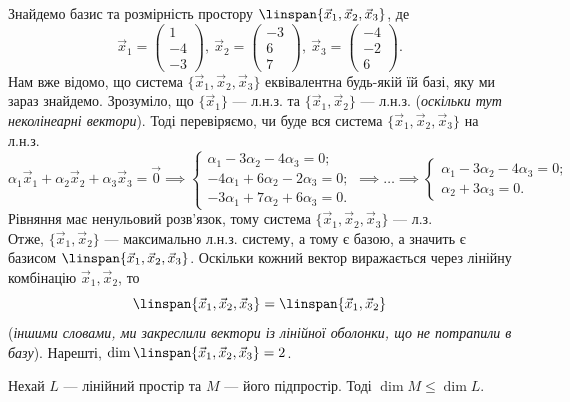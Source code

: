\documentclass{math_library}
\begin{document}
	\begin{example}
	Знайдемо базис та розмірність простору $\linspan \{ \vec{x}_1, \vec{x}_2, \vec{x}_3 \}$, де
	\[
	\vec{x}_1 = \begin{pmatrix}
	1 \\ -4 \\ -3
	\end{pmatrix},\ \vec{x}_2 = \begin{pmatrix}
	-3 \\ 6 \\ 7
	\end{pmatrix},\ \vec{x}_3 = \begin{pmatrix}
	-4 \\ -2 \\ 6
	\end{pmatrix}.
	\]
	Нам вже відомо, що система $\{\vec{x}_1,\vec{x}_2,\vec{x}_3\}$ еквівалентна будь-якій їй базі, яку ми зараз знайдемо. Зрозуміло, що $\{\vec{x}_1\}$ --- л.н.з. та $\{\vec{x}_1, \vec{x}_2\}$ --- л.н.з. (\textit{оскільки тут неколінеарні вектори}). Тоді перевіряємо, чи буде вся система $\{\vec{x}_1,\vec{x}_2,\vec{x}_3 \}$ на л.н.з.
	\[
	\alpha_1 \vec{x}_1 + \alpha_2 \vec{x}_2 + \alpha_3 \vec{x}_3 = \vec{0} \implies 		\begin{cases}
	\alpha_1 - 3 \alpha_2 - 4 \alpha_3 = 0; \\
	-4\alpha_1 + 6 \alpha_2 - 2 \alpha_3 = 0; \\
	-3\alpha_1 + 7 \alpha_2 + 6 \alpha_3 = 0.
	\end{cases} \implies \dots \implies \begin{cases} \alpha_1 - 3 \alpha_2 - 4 \alpha_3 = 0; \\ \alpha_2 + 3 \alpha_3 = 0. \end{cases}
	\]
	Рівняння має ненульовий розв'язок, тому система $\{\vec{x}_1,\vec{x}_2,\vec{x}_3\}$ --- л.з.\\
	Отже, $\{\vec{x}_1,\vec{x}_2\}$ --- максимально л.н.з. систему, а тому є базою, а значить є базисом $\linspan \{\vec{x}_1,\vec{x}_2,\vec{x}_3 \}$. Оскільки кожний вектор виражається через лінійну комбінацію $\vec{x}_1,\vec{x}_2$, то 
	\[
	\linspan \{\vec{x}_1,\vec{x}_2,\vec{x}_3 \} = \linspan \{\vec{x}_1,\vec{x}_2 \}
	\]
	(\textit{іншими словами, ми закреслили вектори із лінійної оболонки, що не потрапили в базу}). Нарешті, $\dim \linspan \{\vec{x}_1,\vec{x}_2,\vec{x}_3\} = 2$.
	\end{example}
	
	\begin{proposition}
	Нехай $L$ --- лінійний простір та $M$ --- його підпростір. Тоді $\dim M \leq \dim L$.
	\end{proposition}
	
\end{document}
